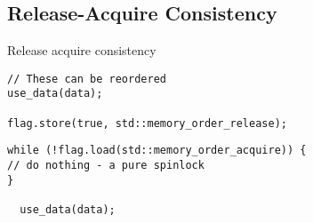 \subsection{Release-Acquire Consistency}
Release acquire consistency
\begin{minipage}{.49\textwidth}
\begin{verbatim}
// These can be reordered
use_data(data);

flag.store(true, std::memory_order_release);

  \end{verbatim}
\end{minipage}
\hfill
\begin{minipage}{.49\textwidth}
  \begin{verbatim}
while (!flag.load(std::memory_order_acquire)) {
// do nothing - a pure spinlock
}

  use_data(data);
  \end{verbatim}
\end{minipage}
\unfinished